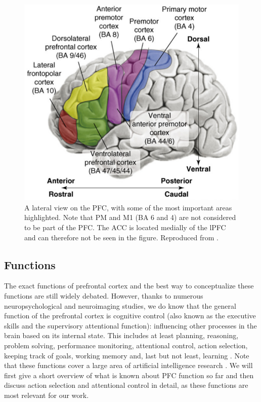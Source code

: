 \documentclass[10pt,a4paper]{report}
\begin{document}
\begin{figure}[bthp]
\begin{center}
\includegraphics[scale=0.4]{figures/Badre08_1.png}
\caption{A lateral view on the PFC, with some of the most important areas highlighted. Note that PM and M1 (BA 6 and 4) are not considered to be part of the PFC. The ACC is located medially of the lPFC and can therefore not be seen in the figure. Reproduced from \citet{Badre2008}.}
\label{areas1}
\end{center}
\end{figure}

\subsection*{Functions}

The exact functions of prefrontal cortex and the best way to conceptualize these functions are still widely debated. However, thanks to numerous neuropsychological and neuroimaging studies, we do know that the general function of the prefrontal cortex is cognitive control (also known as the executive skills and the supervisory attentional function): influencing other processes in the brain based on its internal state. This includes at least planning, reasoning, problem solving, performance monitoring, attentional control, action selection, keeping track of goals, working memory and, last but not least, learning \citep{D'Esposito2002,Wood2003,Dayan2008,fuster2008prefrontal}. Note that these functions cover a large area of artificial intelligence research \citep{Russell1995}. We will first give a short overview of what is known about PFC function so far and then discuss action selection and attentional control in detail, as these functions are most relevant for our work.
\end{document}
